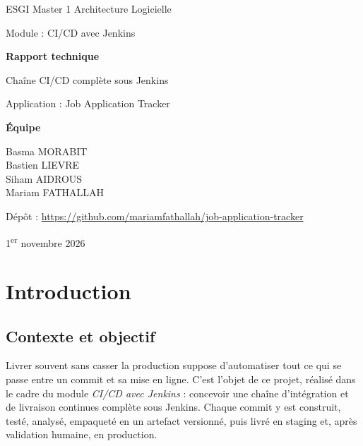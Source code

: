 \documentclass[11pt,a4paper]{report}
\begin{document}
\begin{titlepage}
  \centering
  \vspace*{1cm}
  {\large ESGI \textendash{} Master 1 Architecture Logicielle\par}
  \vspace{0.5cm}
  {\large Module : CI/CD avec Jenkins\par}
  \vspace{3cm}
  {\Huge\bfseries Rapport technique\par}
  \vspace{0.6cm}
  {\LARGE Chaîne CI/CD complète sous Jenkins\par}
  \vspace{0.4cm}
  {\large Application : Job Application Tracker\par}
  \vspace{3cm}
  {\large\bfseries Équipe\par}
  \vspace{0.3cm}
  {\large
    Basma MORABIT \\
    Bastien LIEVRE \\
    Siham AIDROUS \\
    Mariam FATHALLAH \par}
  \vfill
  {\large Dépôt : \url{https://github.com/mariamfathallah/job-application-tracker}\par}
  \vspace{0.3cm}
  {\large 1\textsuperscript{er} novembre 2026\par}
\end{titlepage}

\tableofcontents
\clearpage

\chapter*{Introduction}

\section*{Contexte et objectif}
Livrer souvent sans casser la production suppose d'automatiser tout ce qui se passe entre un commit et sa mise en ligne. C'est l'objet de ce projet, réalisé dans le cadre du module \emph{CI/CD avec Jenkins} : concevoir une chaîne d'intégration et de livraison continues complète sous Jenkins. Chaque commit y est construit, testé, analysé, empaqueté en un artefact versionné, puis livré en staging et, après validation humaine, en production.
\end{document}
